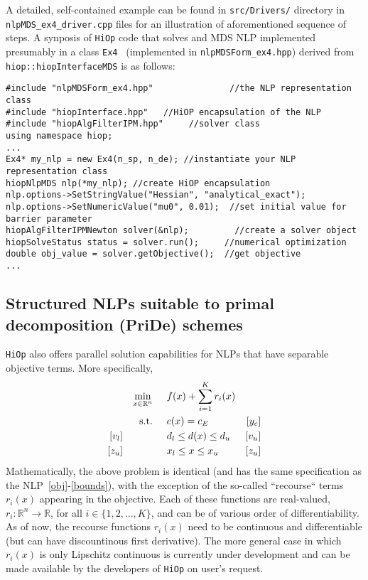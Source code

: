 \documentclass[11pt]{article}
\newcommand{\Hi}{\texttt{HiOp}\xspace}
\begin{document}
A detailed, self-contained example can be found in \texttt{src/Drivers/} directory in \texttt{nlpMDS\_ex4\_driver.cpp} files for an illustration of aforementioned sequence of steps. A synposis of \Hi code that solves and MDS NLP implemented presumably in a class \texttt{Ex4 } (implemented in \texttt{nlpMDSForm\_ex4.hpp}) derived from \texttt{hiop::hiopInterfaceMDS} is as follows:
\begin{lstlisting}
#include "nlpMDSForm_ex4.hpp"               //the NLP representation class
#include "hiopInterface.hpp"   //HiOP encapsulation of the NLP
#include "hiopAlgFilterIPM.hpp"     //solver class
using namespace hiop;
...
Ex4* my_nlp = new Ex4(n_sp, n_de); //instantiate your NLP representation class                    
hiopNlpMDS nlp(*my_nlp); //create HiOP encapsulation
nlp.options->SetStringValue("Hessian", "analytical_exact");
nlp.options->SetNumericValue("mu0", 0.01);  //set initial value for  barrier parameter
hiopAlgFilterIPMNewton solver(&nlp);         //create a solver object
hiopSolveStatus status = solver.run();     //numerical optimization
double obj_value = solver.getObjective();  //get objective
...
\end{lstlisting}


\subsection{Structured NLPs suitable to primal decomposition (PriDe) schemes}\label{sec:pride}

\Hi also offers parallel solution capabilities for NLPs that have separable objective terms. More specifically,
\begin{align}
&&&&\min_{x\in\mathbb{R}^n} & \hspace{0.5cm} f(x) + \sum_{i=1}^K r_i(x) &&&& \label{prideobj}\\
&&&&\textnormal{s.t.} &\hspace{0.5cm}  c(x)=c_E &[y_c]&&&\\
&&[v_l]&&& \hspace{0.5cm} d_l \leq d(x) \leq d_u  &[v_u]&&&\label{prideineq} \\
&&[z_u]&&& \hspace{0.5cm} x_l \leq x \leq x_u & [z_u] &&&\label{pridebounds}
\end{align}
Mathematically, the above problem is identical (and has the same specification as the NLP~\eqref{obj}-\eqref{bounds}), with the exception of the so-called ``recourse`` terms $r_i(x)$ appearing in the objective. Each of these functions are real-valued, $r_i:\mathbb{R}^n\rightarrow \mathbb{R}$, for all $i\in\{1,2,\ldots, K\}$, and can be of various order of differentiability. As of now, the recourse functions $r_i(x)$ need to be continuous and differentiable (but can have discountinous first derivative). The more general case in which $r_i(x)$ is only Lipschitz continuous is currently under development and can be made available by the developers of \Hi on user's request.
\end{document}
